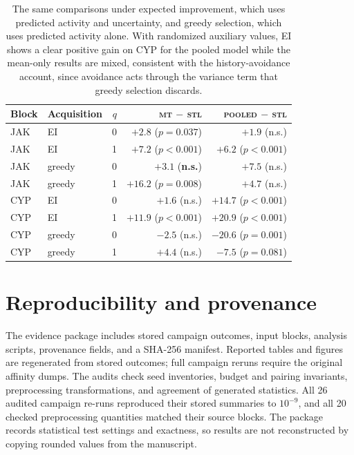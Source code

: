 \documentclass[10pt]{article}
\newcommand{\stl}{\textsc{stl}}
\newcommand{\mt}{\textsc{mt}}
\newcommand{\pooled}{\textsc{pooled}}
\begin{document}
\begin{table}[htbp]
\centering\small
\begin{tabular}{llrrr}
\toprule
Block & Acquisition & $q$ & \mt{} $-$ \stl{} & \pooled{} $-$ \stl{} \\
\midrule
JAK & EI     & 0 & $+2.8$ ($p=0.037$) & $+1.9$ (n.s.) \\
JAK & EI     & 1 & $+7.2$ ($p<0.001$) & $+6.2$ ($p<0.001$) \\
JAK & greedy & 0 & $+3.1$ (\textbf{n.s.}) & $+7.5$ (n.s.) \\
JAK & greedy & 1 & $\mathbf{+16.2}$ ($p=0.008$) & $+4.7$ (n.s.) \\
\midrule
CYP & EI     & 0 & $+1.6$ (n.s.) & $\mathbf{+14.7}$ ($p<0.001$) \\
CYP & EI     & 1 & $+11.9$ ($p<0.001$) & $+20.9$ ($p<0.001$) \\
CYP & greedy & 0 & $-2.5$ (n.s.) & $\mathbf{-20.6}$ ($p=0.001$) \\
CYP & greedy & 1 & $+4.4$ (n.s.) & $\mathbf{-7.5}$ ($p=0.081$) \\
\bottomrule
\end{tabular}
\caption{The same comparisons under expected improvement, which uses
predicted activity and uncertainty, and greedy selection, which uses
predicted activity alone. With randomized auxiliary values, EI shows a clear
positive gain on CYP for the pooled model while the mean-only results are
mixed, consistent with the history-avoidance account, since avoidance acts
through the variance term that greedy selection discards.}
\label{tab:greedy}
\end{table}

\section{Reproducibility and provenance}
\label{app:repro}

The evidence package includes stored campaign outcomes, input blocks,
analysis scripts, provenance fields, and a SHA-256 manifest. Reported tables
and figures are regenerated from stored outcomes; full campaign reruns
require the original affinity dumps. The audits check seed inventories,
budget and pairing invariants, preprocessing transformations, and agreement
of generated statistics. All 26 audited campaign re-runs reproduced their
stored summaries to $10^{-9}$, and all 20 checked preprocessing quantities
matched their source blocks. The package records statistical test settings
and exactness, so results are not reconstructed by copying rounded values
from the manuscript.
\end{document}
